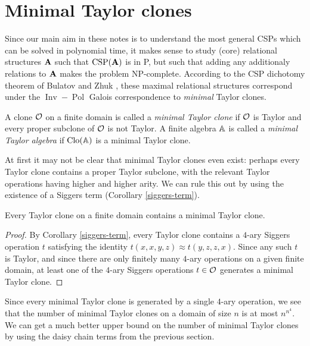 \documentclass[letterpaper,11pt]{article}
\DeclareMathOperator{\Clo}{Clo}
\DeclareMathOperator{\Pol}{Pol}
\DeclareMathOperator{\Inv}{Inv}
\DeclareMathOperator{\CSP}{CSP}
\begin{document}



\section{Minimal Taylor clones}

Since our main aim in these notes is to understand the most general CSPs which can be solved in polynomial time, it makes sense to study (core) relational structures $\mathbf{A}$ such that $\CSP(\fA)$ is in P, but such that adding any additionaly relations to $\mathbf{A}$ makes the problem NP-complete. According to the CSP dichotomy theorem of Bulatov \cite{bulatov-dichotomy} and Zhuk \cite{zhuk-dichotomy}, these maximal relational structures correspond under the $\Inv-\Pol$ Galois correspondence to \emph{minimal} Taylor clones.

\begin{defn} A clone $\mathcal{O}$ on a finite domain is called a \emph{minimal Taylor clone} if $\mathcal{O}$ is Taylor and every proper subclone of $\mathcal{O}$ is not Taylor. A finite algebra $\mathbb{A}$ is called a \emph{minimal Taylor algebra} if $\Clo(\bA)$ is a minimal Taylor clone.
\end{defn}

At first it may not be clear that minimal Taylor clones even exist: perhaps every Taylor clone contains a proper Taylor subclone, with the relevant Taylor operations having higher and higher arity. We can rule this out by using the existence of a Siggers term (Corollary \ref{siggers-term}).

\begin{prop} Every Taylor clone on a finite domain contains a minimal Taylor clone.
\end{prop}
\begin{proof} By Corollary \ref{siggers-term}, every Taylor clone contains a $4$-ary Siggers operation $t$ satisfying the identity $t(x,x,y,z) \approx t(y,z,z,x)$. Since any such $t$ is Taylor, and since there are only finitely many $4$-ary operations on a given finite domain, at least one of the $4$-ary Siggers operations $t \in \mathcal{O}$ generates a minimal Taylor clone.
\end{proof}

Since every minimal Taylor clone is generated by a single $4$-ary operation, we see that the number of minimal Taylor clones on a domain of size $n$ is at most $n^{n^4}$. We can get a much better upper bound on the number of minimal Taylor clones by using the daisy chain terms from the previous section.
\end{document}
